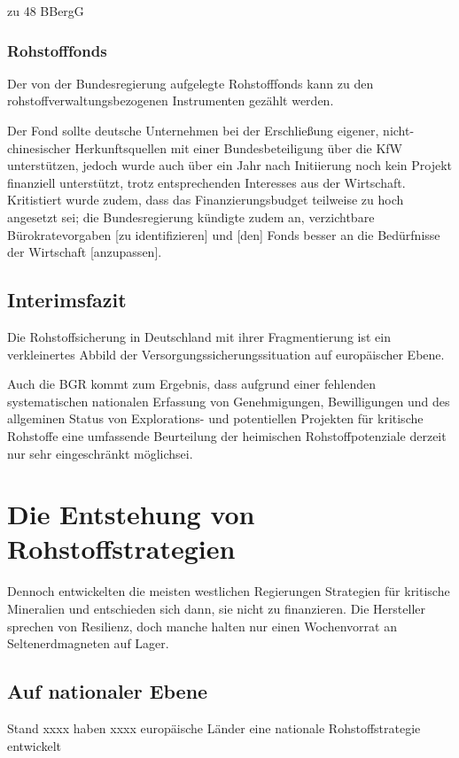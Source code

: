 \documentclass[12pt,a4paper,oneside]{book} %
\begin{document}
zu 48 BBergG

\subsubsection{Rohstofffonds}
Der von der Bundesregierung aufgelegte Rohstofffonds kann zu den rohstoffverwaltungsbezogenen Instrumenten gezählt werden.

Der Fond sollte deutsche Unternehmen bei der Erschließung eigener, nicht-chinesischer Herkunftsquellen mit einer Bundesbeteiligung über die KfW unterstützen, jedoch wurde auch über ein Jahr nach Initiierung noch kein Projekt finanziell unterstützt, trotz entsprechenden Interesses aus der Wirtschaft. Kritistiert wurde zudem, dass das Finanzierungsbudget teilweise zu hoch angesetzt sei; die Bundesregierung kündigte zudem an, \glqq verzichtbare Bürokratevorgaben [zu identifizieren] und [den] Fonds besser an die Bedürfnisse der Wirtschaft [anzupassen]\grqq.\autocite{Wirtschaft fordert mehr Tempo bei Rohstofffonds}

\subsection{Interimsfazit}
Die Rohstoffsicherung in Deutschland mit ihrer Fragmentierung ist ein verkleinertes Abbild der Versorgungssicherungssituation auf europäischer Ebene.

Auch die BGR kommt zum Ergebnis, dass aufgrund einer fehlenden systematischen nationalen Erfassung von Genehmigungen, Bewilligungen und des allgeminen Status von Explorations- und potentiellen Projekten für kritische Rohstoffe \glqq eine umfassende Beurteilung der heimischen Rohstoffpotenziale derzeit nur sehr eingeschränkt möglich\grqq sei.\autocite{Top Commodity News 73, S. 14}

\section{Die Entstehung von Rohstoffstrategien}

Dennoch entwickelten die meisten westlichen Regierungen Strategien für kritische Mineralien und entschieden sich dann, sie nicht zu finanzieren. Die Hersteller sprechen von Resilienz, doch manche halten nur einen Wochenvorrat an Seltenerdmagneten auf Lager.

\subsection{Auf nationaler Ebene}
Stand xxxx haben xxxx europäische Länder eine nationale Rohstoffstrategie entwickelt
\end{document}
